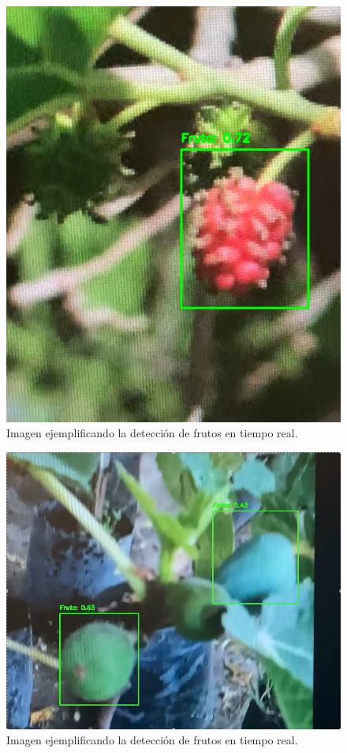 \documentclass[conference]{IEEEtran}
\begin{document}
\begin{figure}[ht]
    \centering
    \includegraphics[width=\columnwidth]{images/detection2.png}
    \caption{Imagen ejemplificando la detección de frutos en tiempo real.}
    \label{fig:detection2}
\end{figure}

\begin{figure}[ht]
    \centering
    \includegraphics[width=\columnwidth]{images/detection3.png}
    \caption{Imagen ejemplificando la detección de frutos en tiempo real.}
    \label{fig:detection3}
\end{figure}
\end{document}
